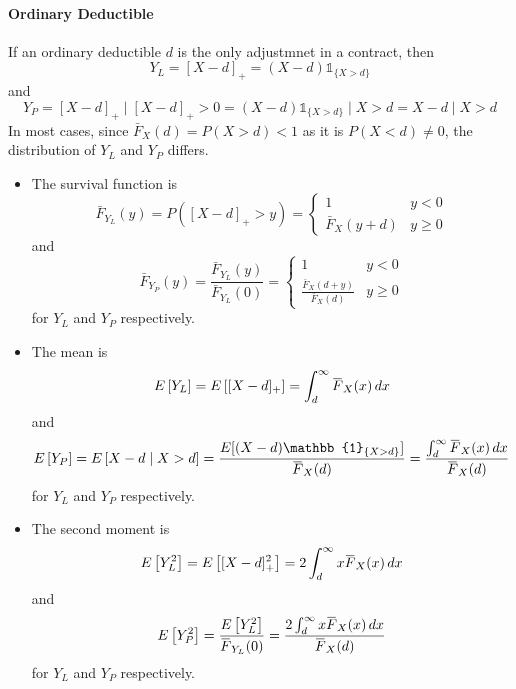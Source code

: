 \documentclass[notoc,notitlepage]{tufte-book}
\begin{document}
\paragraph{Ordinary Deductible} If an ordinary deductible $d$ is the only adjustmnet in a contract, then
\begin{equation*}
  Y_L = [ X - d ]_+ = (X - d) \mathbb{1}_{\{X > d\}}
\end{equation*}
and
\begin{equation*}
  Y_P = [ X - d ]_+ \mid [ X - d ]_+ > 0 = ( X - d ) \mathbb{1}_{\{X > d\}} \mid X > d = X - d \mid X > d
\end{equation*}
In most cases, since $\bar{F}_X(d) = P(X > d) < 1$ as it is $P(X < d) \neq 0$, the distribution of $Y_L$ and $Y_P$ differs.
\begin{itemize}
  \item The survival function is
    \begin{equation*}
      \bar{F}_{Y_L}(y) = P( [ X - d ]_+ > y ) = \begin{cases}
        1 & y < 0 \\
        \bar{F}_X(y + d) & y \geq 0
      \end{cases}
    \end{equation*}
    and
    \begin{equation*}
      \bar{F}_{Y_P}(y) = \frac{\bar{F}_{Y_L}(y)}{\bar{F}_{Y_L}(0)} = \begin{cases}
        1                                       & y < 0 \\
        \frac{\bar{F}_{X}(d + y)}{\bar{F}_X(d)} & y \geq 0
      \end{cases}
    \end{equation*}
    for $Y_L$ and $Y_P$ respectively.

  \item The mean is
    \begin{equation*}
      E \left[ Y_L \right] = E \left[ [ X - d ]_+ \right] = \int_{d}^{\infty} \bar{F}_X(x) \dif{x}
    \end{equation*}
    and
    \begin{equation*}
      E \left[ Y_P \right] = E \left[ X - d \mid X > d \right] = \frac{E [ (X - d) \mathbb{1}_{\{X > d\}} ]}{\bar{F}_X(d)} = \frac{\int_{d}^{\infty} \bar{F}_X(x) \dif{x}}{\bar{F}_X(d)}
    \end{equation*}
    for $Y_L$ and $Y_P$ respectively.

  \item The second moment is
    \begin{equation*}
      E \left[ Y_L^2 \right] = E \left[ [ X - d ]_+^2 \right] = 2 \int_{d}^{\infty} x \bar{F}_X(x) \dif{x}
    \end{equation*}
    and
    \begin{equation*}
      E \left[ Y_P^2 \right] = \frac{E \left[ Y_L^2 \right]}{\bar{F}_{Y_L}(0)} = \frac{2 \int_{d}^{\infty} x \bar{F}_X(x) \dif{x}}{\bar{F}_X(d)}
    \end{equation*}
    for $Y_L$ and $Y_P$ respectively.
\end{itemize}
\end{document}
